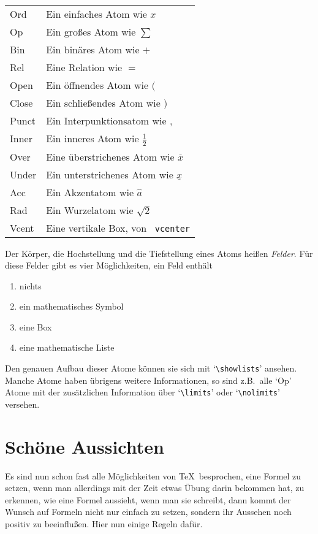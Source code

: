 \medskip\begin{tabular}{ll}
Ord & Ein einfaches Atom wie $x$\\
Op  & Ein gro\ss{}es Atom wie $\sum$\\
Bin & Ein bin\"ares Atom wie $+$\\
Rel & Eine Relation wie $=$\\
Open & Ein \"offnendes Atom wie $($\\
Close & Ein schlie\ss{}endes Atom wie $)$\\
Punct & Ein Interpunktionsatom wie $,$\\
Inner & Ein inneres Atom wie $\frac{1}{2}$\\
Over & Eine \"uberstrichenes Atom wie $\overline{x}$\\
Under & Ein unterstrichenes Atom wie $\underline{x}$\\
Acc & Ein Akzentatom wie $\hat a$\\
Rad & Ein Wurzelatom wie $\sqrt{2}$\\
Vcent & Eine vertikale Box, von {\tt\char92 vcenter}
\end{tabular}\medskip{}

Der K\"orper, die 
Hochstellung und die Tiefstellung eines Atoms hei\ss{}en
{\em Felder}. F\"ur diese Felder gibt es vier M\"oglichkeiten, ein Feld
enth\"alt
\begin{enumerate}
\item nichts
\item ein mathematisches Symbol
\item eine Box
\item eine mathematische Liste
\end{enumerate}
Den genauen Aufbau dieser Atome k\"onnen sie sich mit
`\verb|\showlists|'
ansehen. Manche Atome haben \"ubrigens weitere Informationen, so sind
z.B.\ alle `Op' Atome mit der zus\"atzlichen Information \"uber
`\verb|\limits|' oder `\verb|\nolimits|' versehen.
\section{Sch\"one Aussichten}
Es sind nun schon fast alle M\"oglichkeiten von \TeX\ besprochen, eine
Formel zu setzen, wenn man allerdings mit der Zeit etwas \"Ubung darin
bekommen hat, zu erkennen, wie eine Formel aussieht, wenn man sie
schreibt, dann kommt der Wunsch auf Formeln nicht nur einfach zu
setzen, sondern ihr Aussehen noch positiv zu beeinflu\ss{}en. Hier nun
einige Regeln daf\"ur.
